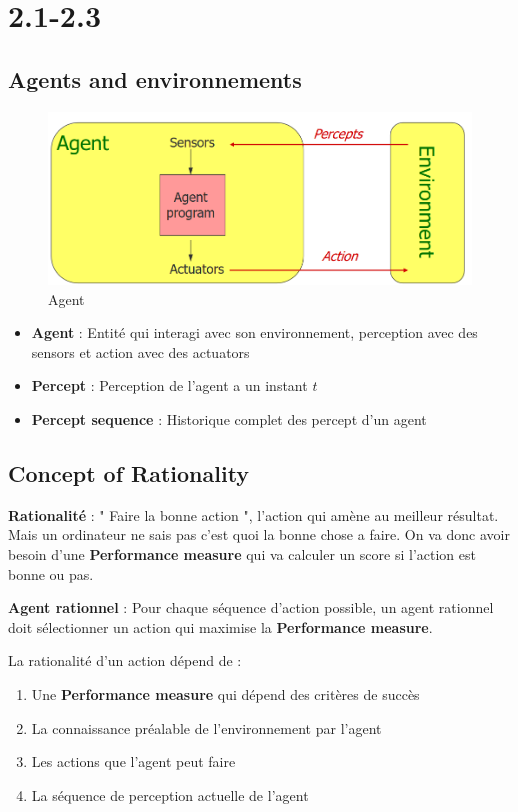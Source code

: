 \section{2.1-2.3}
\subsection{Agents and environnements}
	\begin{figure}[H]
		\centering
		\includegraphics[width=\textwidth]{img/agent.png}
		\caption{Agent}
	\end{figure}
	
	\begin{itemize}
		\item \textbf{Agent} : Entité qui interagi avec son environnement, perception avec des sensors et action avec des actuators
		\item \textbf{Percept} : Perception de l'agent a un instant $t$
		\item \textbf{Percept sequence} : Historique complet des percept d'un agent
	\end{itemize}
\subsection{Concept of Rationality}

	\textbf{Rationalité} : " Faire la bonne action ", l'action qui amène au meilleur résultat. Mais un ordinateur ne sais pas c'est quoi la bonne chose a faire. On va donc avoir besoin d'une \textbf{Performance measure} qui va calculer un score si l'action est bonne ou pas.
	
	\textbf{Agent rationnel} : Pour chaque séquence d'action possible, un agent rationnel doit sélectionner un action qui maximise la \textbf{Performance measure}.
	
	La rationalité d'un action dépend de :
	\begin{enumerate}
		\item Une \textbf{Performance measure} qui dépend des critères de succès
		\item La connaissance préalable de l'environnement par l'agent
		\item Les actions que l'agent peut faire
		\item La séquence de perception actuelle de l'agent
		
	\end{enumerate}
	
